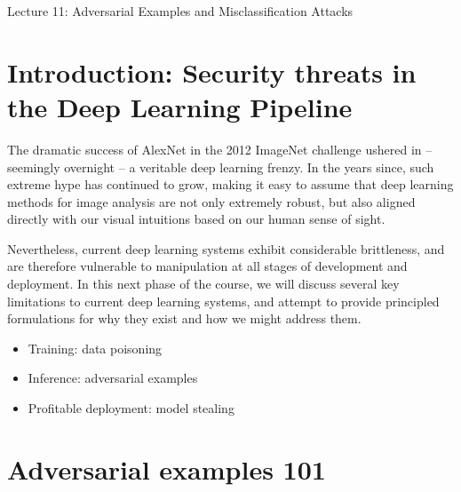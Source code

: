 \documentclass[10pt]{article}
\begin{document}
   \noindent
   \begin{center}

   \hrulefill
   
   \vspace{5pt}
   
   \vspace{0pt}
   
   {\Large \hfill  Lecture 11: Adversarial Examples and Misclassification Attacks \hfill}
   \vspace{10pt}
   
   
   \vspace{-3pt}
   \hrulefill
   \end{center}


\section{Introduction: Security threats in the Deep Learning Pipeline}

The dramatic success of AlexNet in the 2012 ImageNet challenge \cite{alexnet} ushered in -- seemingly overnight -- a veritable deep learning frenzy. In the years since, such extreme hype has continued to grow, making it easy to assume that deep learning methods for image analysis are not only extremely robust, but also aligned directly with our visual intuitions based on our human sense of sight.

Nevertheless, current deep learning systems exhibit considerable brittleness, and are therefore vulnerable to manipulation at all stages of development and deployment. In this next phase of the course, we will discuss several key limitations to current deep learning systems, and attempt to provide principled formulations for why they exist and how we might address them. 

\begin{itemize}
  \item Training: data poisoning
  \item Inference: adversarial examples
  \item Profitable deployment: model stealing
\end{itemize}

\section{Adversarial examples 101}
\end{document}
